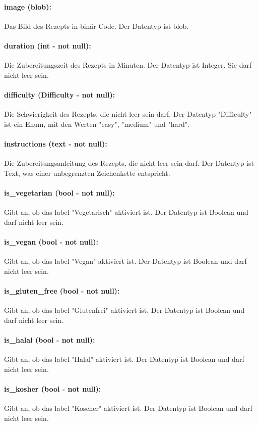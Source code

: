 \documentclass[parskip=full]{scrartcl}
\begin{document}
\paragraph{image (blob):} Das Bild des Rezepts in binär Code. Der Datentyp ist \Gls{blob}.
\paragraph{duration (int - not null):} Die Zubereitungszeit des Rezepts in Minuten. Der Datentyp ist Integer. Sie darf nicht leer sein.
\paragraph{difficulty (Difficulty - not null):} Die Schwierigkeit des Rezepts, die nicht leer sein darf. Der Datentyp "Difficulty" ist ein Enum, mit den Werten "easy", "medium" und "hard".
\paragraph{instructions (text - not null):} Die Zubereitungsanleitung des Rezepts, die nicht leer sein darf. Der Datentyp ist Text, was einer unbegrenzten Zeichenkette entspricht.
\paragraph{is\_vegetarian (bool - not null):} Gibt an, ob das \Gls{label} "Vegetarisch" aktiviert ist. Der Datentyp ist Boolean und darf nicht leer sein.
\paragraph{is\_vegan (bool - not null):} Gibt an, ob das \Gls{label} "Vegan" aktiviert ist. Der Datentyp ist Boolean und darf nicht leer sein.
\paragraph{is\_gluten\_free (bool - not null):} Gibt an, ob das \Gls{label} "Glutenfrei" aktiviert ist. Der Datentyp ist Boolean und darf nicht leer sein.
\paragraph{is\_halal (bool - not null):} Gibt an, ob das \Gls{label} "Halal" aktiviert ist. Der Datentyp ist Boolean und darf nicht leer sein.
\paragraph{is\_kosher (bool - not null):} Gibt an, ob das \Gls{label} "Koscher" aktiviert ist. Der Datentyp ist Boolean und darf nicht leer sein.
\newpage
\end{document}
